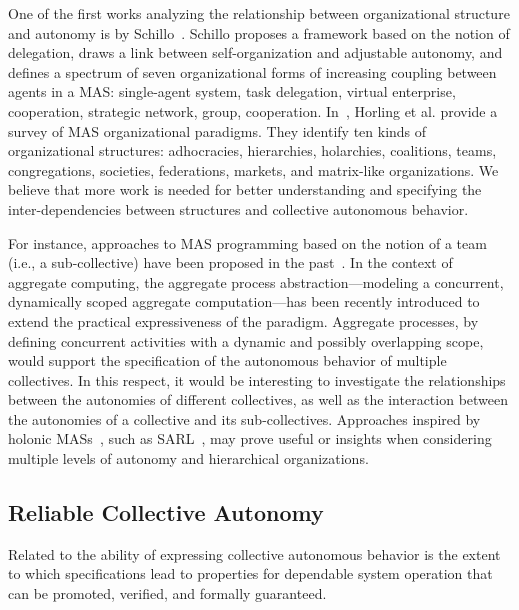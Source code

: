 \documentclass[jsan,article,accept,moreauthors,pdftex]{Definitions/mdpi}
\begin{document}
\begin{paracol}{2}
One of the first works analyzing the relationship between organizational structure
 and autonomy 
 is by Schillo~\cite{DBLP:journals/connection/Schillo02}.
%
Schillo proposes a framework based on the notion of {delegation},
draws a link between self-organization and adjustable autonomy,
and defines a spectrum of seven organizational forms of increasing coupling between agents in a MAS: 
 single-agent system,
 task delegation,
 virtual enterprise,
 cooperation,
 strategic network,
 group,
 cooperation.
%
In~\cite{DBLP:journals/ker/HorlingL04},
 Horling et al. 
 provide a survey of MAS organizational paradigms.
%
They identify ten kinds of organizational structures:
 adhocracies, hierarchies, holarchies, coalitions, teams, congregations, societies, federations, markets, and matrix-like organizations.
%
We believe that more work is needed for better understanding and specifying the inter-dependencies between structures
 and collective autonomous behavior.

For instance, approaches to MAS programming 
 based on the notion of a {team} (i.e., a sub-collective)
 have been proposed in the past~\cite{DBLP:conf/atal/PynadathTCC99,DBLP:journals/jnca/JarvisRMJ06,DBLP:conf/mobiquitous/KoutsoubeliasL16}.
%
In the context of aggregate computing,
 the {aggregate process} abstraction---modeling a concurrent, dynamically scoped aggregate computation---has been recently introduced to extend the
 practical expressiveness of the paradigm.
%
Aggregate processes,
 by defining concurrent activities
 with a dynamic and possibly overlapping scope,
 would support
 the specification of the autonomous behavior
 of multiple collectives.
%
In this respect,
 it would be interesting to investigate
 the relationships between the autonomies of different collectives,
 as well as the interaction between the autonomies
 of a collective and its sub-collectives.
%
Approaches inspired by holonic MASs~\cite{DBLP:series/ncs/RodriguezHGGK11},
 such as SARL~\cite{DBLP:conf/webi/RodriguezGG14},
 may prove useful or insights when considering multiple levels of autonomy and
 hierarchical organizations.
 

\subsection{Reliable Collective Autonomy}
\label{gaps:reliability}

Related to the ability of expressing collective autonomous behavior
 is the extent to which specifications lead to properties 
 for dependable system operation that can be 
 promoted, verified, and formally guaranteed.


\end{paracol}
\end{document}
